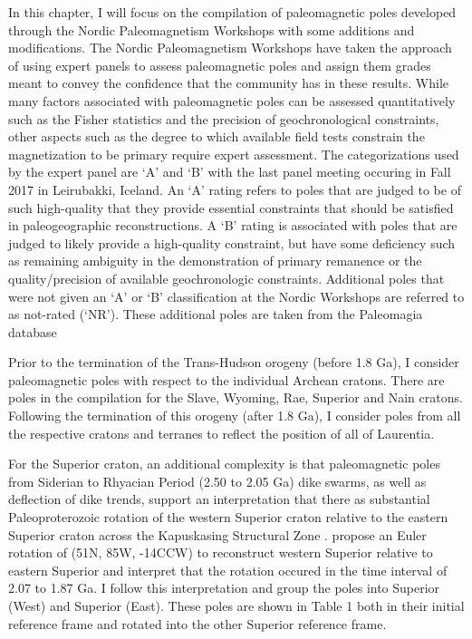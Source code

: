 \documentclass[11pt,letterpaper]{article}
\begin{document}
In this chapter, I will focus on the compilation of paleomagnetic poles developed through the Nordic Paleomagnetism Workshops with some additions and modifications. The Nordic Paleomagnetism Workshops have taken the approach of using expert panels to assess paleomagnetic poles and assign them grades meant to convey the confidence that the community has in these results. While many factors associated with paleomagnetic poles can be assessed quantitatively such as the Fisher statistics and the precision of geochronological constraints, other aspects such as the degree to which available field tests constrain the magnetization to be primary require expert assessment. The categorizations used by the expert panel are `A' and `B' with the last panel meeting occuring in Fall 2017 in Leirubakki, Iceland. An `A' rating refers to poles that are judged to be of such high-quality that they provide essential constraints that should be satisfied in paleogeographic reconstructions. A `B' rating is associated with poles that are judged to likely provide a high-quality constraint, but have some deficiency such as remaining ambiguity in the demonstration of primary remanence or the quality/precision of available geochronologic constraints. Additional poles that were not given an `A' or `B' classification at the Nordic Workshops are referred to as not-rated (`NR'). These additional poles are taken from the Paleomagia database \citep{Veikkolainen2013a}

Prior to the termination of the Trans-Hudson orogeny (before 1.8 Ga), I consider paleomagnetic poles with respect to the individual Archean cratons. There are poles in the compilation for the Slave, Wyoming, Rae, Superior and Nain cratons. Following the termination of this orogeny (after 1.8 Ga), I consider poles from all the respective cratons and terranes to reflect the position of all of Laurentia.

For the Superior craton, an additional complexity is that paleomagnetic poles from Siderian to Rhyacian Period (2.50 to 2.05 Ga) dike swarms, as well as deflection of dike trends, support an interpretation that there as substantial Paleoproterozoic rotation of the western Superior craton relative to the eastern Superior craton across the Kapuskasing Structural Zone \citep{Bates1991a, Evans2010a}. \cite{Evans2010a} propose an Euler rotation of (51\textdegree N, 85\textdegree W, -14\textdegree CCW) to reconstruct western Superior relative to eastern Superior and interpret that the rotation occured in the time interval of 2.07 to 1.87 Ga. I follow this interpretation and group the poles into Superior (West) and Superior (East). These poles are shown in Table 1 both in their initial reference frame and rotated into the other Superior reference frame.
\end{document}
